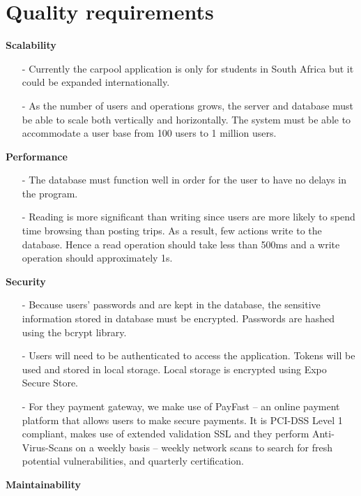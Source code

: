 \documentclass[hidelinks, 12pt, a4paper]{article}
\begin{document}
\section{Quality requirements}
\large{ \textbf{Scalability}}
\begin{itemize}
      \item[-] Currently the carpool application is only for students in South Africa but it could be expanded internationally.
      \item[-] As the number of users and operations grows, the server and database must be able to scale both vertically and horizontally.  The system must be able to accommodate a user base from 100 users to 1 million users.
\end{itemize}
\vspace{0.5cm}
\large{ \textbf{Performance}}
\begin{itemize}
      \item[-] The database must function well in order for the user to have no delays in the program.
      \item[-] Reading is more significant than writing since users are more likely to spend time browsing than posting trips. As a result, few actions write to the database. Hence a read operation should take less than 500ms and a write operation should approximately 1s.
\end{itemize}
\vspace{0.5cm}
\large{ \textbf{Security}}
\begin{itemize}
      \item[-] Because users' passwords and are kept in the database, the sensitive information stored in database must be encrypted. Passwords are hashed using the bcrypt library.
      \item [-] Users will need to be authenticated to access the application. Tokens will be used
and stored in local storage. Local storage is encrypted using Expo Secure Store.
      \item [-] For they payment gateway, we make use of PayFast – an online payment platform that allows users to make secure payments. It is PCI-DSS Level 1 compliant, makes use of extended validation SSL and they perform Anti-Virus-Scans on a weekly basis – weekly network scans to search for fresh potential vulnerabilities, and quarterly certification.

\end{itemize}
\vspace{0.5cm}
\large{ \textbf{Maintainability}}
\end{document}
